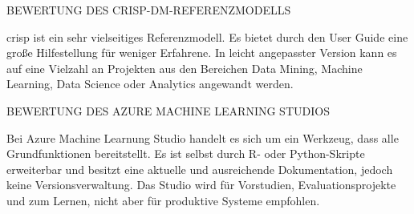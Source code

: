 {\normalsize BEWERTUNG DES CRISP-DM-REFERENZMODELLS} \par
\gls{crisp} ist ein sehr vielseitiges Referenzmodell. Es bietet durch den User Guide eine große Hilfestellung für weniger Erfahrene. In leicht angepasster Version kann es auf eine Vielzahl an Projekten aus den Bereichen Data Mining, Machine Learning, Data Science oder Analytics angewandt werden.

{\normalsize BEWERTUNG DES AZURE MACHINE LEARNING STUDIOS} \par
Bei Azure Machine Learnung Studio handelt es sich um ein Werkzeug, dass alle Grundfunktionen bereitstellt. Es ist selbst durch R- oder Python-Skripte erweiterbar und besitzt eine aktuelle und ausreichende Dokumentation, jedoch keine Versionsverwaltung. Das Studio wird für Vorstudien, Evaluationsprojekte und zum Lernen, nicht aber für produktive Systeme empfohlen.
